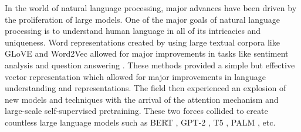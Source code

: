 In the world of natural language processing, major advances have been driven by the proliferation of large models. One of the major goals of natural language processing is to understand human language in all of its intricacies and uniqueness. Word representations created by using large textual corpora like GLoVE \cite{Pennington2014GloVeGV} and Word2Vec \cite{Mikolov2013DistributedRO} allowed for major improvements in tasks like sentiment analysis \cite{Socher2013RecursiveDM} and question answering \cite{Rajpurkar2016SQuAD1Q} \cite{Seo2017BidirectionalAF}. These methods provided a simple but effective vector representation which allowed for major improvements in language understanding and representations. The field then experienced an explosion of new models and techniques with the arrival of the attention mechanism and large-scale self-supervised pretraining. These two forces collided to create countless large language models such as BERT \cite{Devlin2019BERTPO}, GPT-2 \cite{Radford2019LanguageMA}, T5 \cite{Raffel2020ExploringTL}, PALM \cite{Bi2020PALMPA}, etc.
